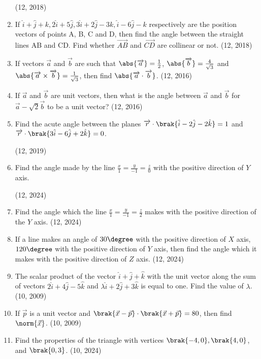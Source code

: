 \begin{enumerate}[label=\thesubsection.\arabic*, ref=\thesubsection.\theenumi]
\hfill (12, 2018)
\item If $\hat{i}+\hat{j}+{k} ,  2\hat{i}+5\hat{j} ,  3\hat{i}+2\hat{j}-3{k} ,  \hat{i}-6\hat{j}-{k}$ respectively are the position vectors of points A, B, C and D, then find the angle between the straight lines AB and CD. Find whether $\overrightarrow{AB}$ and $\overrightarrow{CD}$ are collinear or not. 
\hfill (12, 2018) 
\item If vectors $\overrightarrow{a}$ and $\overrightarrow{b}$ are such that
      $\abs{\overrightarrow{a}} = \frac{1}{2}$, $\abs{\overrightarrow{b}} = \frac{4}{\sqrt{3}}$
      and $\abs{\overrightarrow{a} \times \overrightarrow{b}} = \frac{1}{\sqrt{3}}$, then find
      $\abs{\overrightarrow{a}\cdot \overrightarrow{b} }$. \hfill (12, 2016)
\item If $\overrightarrow{a}$ and $\overrightarrow{b}$ are unit vectors, then what is the angle between
      $\overrightarrow{a}$ and $\overrightarrow{b}$ for $\overrightarrow{a} - \sqrt{2}\overrightarrow{b}$ to be a unit vector? \hfill (12, 2016)
\item Find the acute angle between the planes
      $  \overrightarrow{r} \cdot \brak{\hat{i}-2\hat{j}-2\hat{k}} = 1$
      and
      $  \overrightarrow{r} \cdot \brak{3\hat{i}-6\hat{j}+2\hat{k}} = 0$.

    \hfill (12, 2019)                                                    
				\item Find the angle made by the line $\frac{x}{1} = \frac{y}{-1} = \frac{z}{0} $ with the positive direction of $Y$ axis.  

		\hfill (12, 2024)
 \item Find the angle which the line $\frac{x}{1} = \frac{y}{-1} = \frac{z}{2}$ makes with the positive direction of the $Y$ axis. 
		\hfill (12, 2024)
	\item If a line makes an angle of $30\degree$ with the positive direction of $X$ axis, $120\degree$ with the positive direction of $Y$ axis, then find the angle which it makes with the positive direction of $Z$ axis.
		\hfill (12, 2024)
\item 
The scalar product of the vector $\hat{i} + \hat{j} + \hat{k}$ with the unit vector along the sum of vectors $2\hat{i} + 4\hat{j} - 5\hat{k}$ and $\lambda \hat{i} + 2\hat{j} + 3\hat{k}$ is equal to one. Find the value of $\lambda$.
\hfill	(10, 2009)
\item 
	If $\vec{p}$ is a unit vector and $\brak{\vec{x} - \vec{p}} \cdot \brak{\vec{x} + \vec{p}} = 80$, then find $\norm{\vec{x}}$.
\hfill	(10, 2009)
\item Find the properties of the triangle with vertices $\brak{-4,0}, \brak {4,0}$, and $\brak{0,3}$. 
\hfill	(10, 2024)

\end{enumerate}
